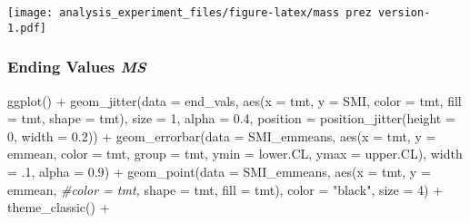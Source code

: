 \documentclass[
]{article}
\newenvironment{Shaded}{\begin{snugshade}}{\end{snugshade}}
\newcommand{\AttributeTok}[1]{\textcolor[rgb]{0.77,0.63,0.00}{#1}}
\newcommand{\CommentTok}[1]{\textcolor[rgb]{0.56,0.35,0.01}{\textit{#1}}}
\newcommand{\DecValTok}[1]{\textcolor[rgb]{0.00,0.00,0.81}{#1}}
\newcommand{\FloatTok}[1]{\textcolor[rgb]{0.00,0.00,0.81}{#1}}
\newcommand{\FunctionTok}[1]{\textcolor[rgb]{0.00,0.00,0.00}{#1}}
\newcommand{\NormalTok}[1]{#1}
\newcommand{\SpecialCharTok}[1]{\textcolor[rgb]{0.00,0.00,0.00}{#1}}
\newcommand{\StringTok}[1]{\textcolor[rgb]{0.31,0.60,0.02}{#1}}
\begin{document}
\texttt{[image: analysis\_experiment\_files/figure-latex/mass prez version-1.pdf]}

\hypertarget{ending-values-ms}{%
\subsubsection{\texorpdfstring{Ending Values
\emph{MS}}{Ending Values MS}}\label{ending-values-ms}}

\begin{Shaded}
\begin{Highlighting}[]
\FunctionTok{ggplot}\NormalTok{() }\SpecialCharTok{+}
  \FunctionTok{geom\_jitter}\NormalTok{(}\AttributeTok{data =}\NormalTok{ end\_vals,}
              \FunctionTok{aes}\NormalTok{(}\AttributeTok{x =}\NormalTok{ tmt,}
                   \AttributeTok{y =}\NormalTok{ SMI, }
                   \AttributeTok{color =}\NormalTok{ tmt,}
                 \AttributeTok{fill =}\NormalTok{ tmt,}
                 \AttributeTok{shape =}\NormalTok{ tmt), }
               \AttributeTok{size =} \DecValTok{1}\NormalTok{,}
              \AttributeTok{alpha =} \FloatTok{0.4}\NormalTok{,}
              \AttributeTok{position =} \FunctionTok{position\_jitter}\NormalTok{(}\AttributeTok{height =} \DecValTok{0}\NormalTok{, }\AttributeTok{width =} \FloatTok{0.2}\NormalTok{)) }\SpecialCharTok{+}
  \FunctionTok{geom\_errorbar}\NormalTok{(}\AttributeTok{data =}\NormalTok{ SMI\_emmeans,}
                \FunctionTok{aes}\NormalTok{(}\AttributeTok{x =}\NormalTok{ tmt,}
                    \AttributeTok{y =}\NormalTok{ emmean, }
                    \AttributeTok{color =}\NormalTok{ tmt,}
                    \AttributeTok{group =}\NormalTok{ tmt,}
                    \AttributeTok{ymin =}\NormalTok{ lower.CL, }
                    \AttributeTok{ymax =}\NormalTok{ upper.CL),}
                \AttributeTok{width =}\NormalTok{ .}\DecValTok{1}\NormalTok{,}
                \AttributeTok{alpha =} \FloatTok{0.9}\NormalTok{) }\SpecialCharTok{+}
  \FunctionTok{geom\_point}\NormalTok{(}\AttributeTok{data =}\NormalTok{ SMI\_emmeans, }
             \FunctionTok{aes}\NormalTok{(}\AttributeTok{x =}\NormalTok{ tmt,}
                   \AttributeTok{y =}\NormalTok{ emmean, }
                   \CommentTok{\#color = tmt,}
                 \AttributeTok{shape =}\NormalTok{ tmt,}
                 \AttributeTok{fill =}\NormalTok{ tmt), }
             \AttributeTok{color =} \StringTok{"black"}\NormalTok{,}
               \AttributeTok{size =} \DecValTok{4}\NormalTok{) }\SpecialCharTok{+}
  \FunctionTok{theme\_classic}\NormalTok{() }\SpecialCharTok{+} 

\end{Highlighting}
\end{Shaded}
\end{document}
